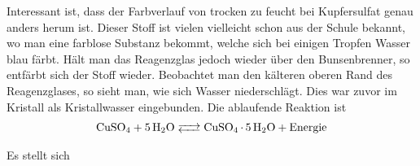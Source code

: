 \documentclass[12pt,a4paper,titlepage,headinclude,bibtotoc]{scrartcl}
\begin{document}
Interessant ist, dass der Farbverlauf von trocken zu feucht bei Kupfersulfat genau anders herum ist.
Dieser Stoff ist vielen vielleicht schon aus der Schule bekannt, wo man eine farblose Substanz bekommt, welche sich bei einigen Tropfen Wasser blau färbt.
Hält man das Reagenzglas jedoch wieder über den Bunsenbrenner, so entfärbt sich der Stoff wieder.
Beobachtet man den kälteren oberen Rand des Reagenzglases, so sieht man, wie sich Wasser niederschlägt.
Dies war zuvor im Kristall als Kristallwasser eingebunden.
Die ablaufende Reaktion ist
\begin{align*}
	\ce{CuSO4 + 5H2O <--> CuSO4 . 5H2O + Energie} 
\end{align*}

Es stellt sich
\end{document}
